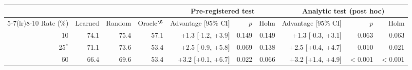 \scriptsize\setlength{\tabcolsep}{2.2pt}\begin{tabular}{rrrrrrrrrr}\toprule
 & & & & \multicolumn{3}{c}{Pre-registered test} & \multicolumn{3}{c}{Analytic test (post hoc)} \\
\cmidrule(lr){5-7}\cmidrule(lr){8-10}
Rate (\%) & Learned & Random & Oracle$^{\S}$ & Advantage [95\% CI] & $p$ & Holm & Advantage [95\% CI] & $p$ & Holm \\
\midrule
10 & 74.1 & 75.4 & 57.1 & +1.3 [-1.2, +3.9] & 0.149 & 0.149 & +1.3 [-0.3, +3.1] & 0.063 & 0.063 \\
25$^{*}$ & 71.1 & 73.6 & 53.4 & +2.5 [-0.9, +5.8] & 0.069 & 0.138 & +2.5 [+0.4, +4.7] & 0.010 & 0.021 \\
60 & 66.4 & 69.6 & 53.4 & +3.2 [+0.1, +6.7] & 0.022 & 0.066 & +3.2 [+1.4, +4.9] & $<$0.001 & $<$0.001 \\
\bottomrule\end{tabular}

